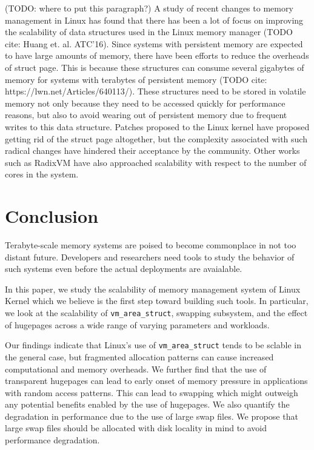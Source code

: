 \documentclass[twocolumn,11pt]{article}
\begin{document}

(TODO: where to put this paragraph?)
A study of recent changes to memory management in Linux has found that there has
been a lot of focus on improving the scalability of data structures used in the
Linux memory manager (TODO cite: Huang et. al. ATC'16). Since systems with
persistent memory are expected to have large amounts of memory, there have been
efforts to reduce the overheads of struct page. This is because these structures
can consume several gigabytes of memory for systems with terabytes of persistent
memory (TODO cite: https://lwn.net/Articles/640113/). These structures need to
be stored in volatile memory not only because they need to be accessed quickly
for performance reasons, but also to avoid wearing out of persistent memory due
to frequent writes to this data structure. Patches proposed to the Linux kernel
have proposed getting rid of the struct page altogether, but the complexity
associated with such radical changes have hindered their acceptance by the
community. Other works such as RadixVM \cite{radixvm} have also approached
scalability with respect to the number of cores in the system.


\section{Conclusion}
Terabyte-scale memory systems are poised to become commonplace in not too distant future.
Developers and researchers need tools to study the behavior of such systems even before the actual
deployments are avaialable. 

In this paper, we study the scalability of memory management 
system of Linux Kernel which we believe is the first step toward building such tools. In particular, 
we look at the scalability of \texttt{vm\_area\_struct},  
swapping subsystem, and the effect of hugepages across a wide range of varying parameters
and workloads. 

Our findings indicate that Linux's use of
\texttt{vm\_area\_struct} tends to be sclable in the general case, but
fragmented allocation patterns can cause increased computational and memory
overheads. We further find that the use of 
transparent hugepages can lead to early onset of memory pressure in applications
with random access patterns. 
This can lead to swapping which might outweigh any potential benefits enabled by the use of hugepages. 
We also quantify the degradation in performance due to the use of large swap
files. We propose that large swap files should be allocated with disk locality
in mind to avoid performance degradation.   
\end{document}
